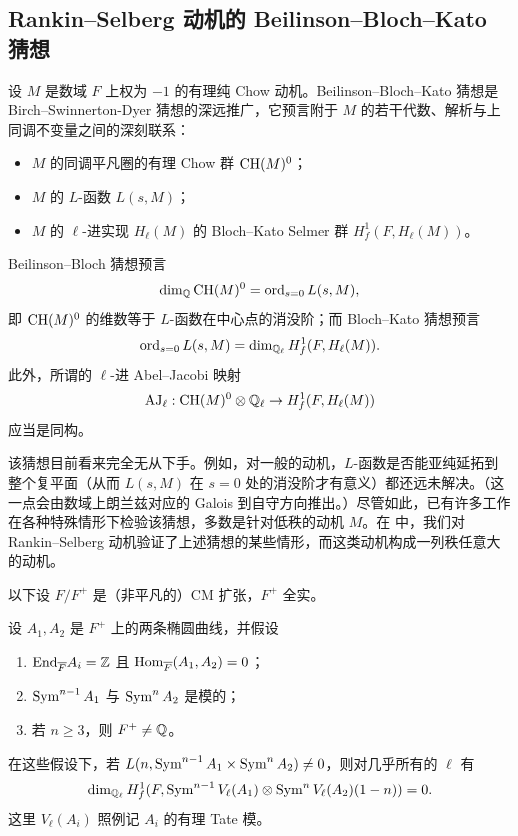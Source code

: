 
\subsection{Rankin--Selberg 动机的 Beilinson--Bloch--Kato 猜想}\label{S: BBK}

设 $M$ 是数域 $F$ 上权为 $-1$ 的有理纯 Chow 动机。Beilinson--Bloch--Kato 猜想是 Birch--Swinnerton-Dyer 猜想的深远推广，它预言附于 $M$ 的若干代数、解析与上同调不变量之间的深刻联系：
\begin{itemize}
\item $M$ 的同调平凡圈的有理 Chow 群 ${\operatorname{CH}}(M)^0$；
\item $M$ 的 $L$-函数 $L(s,M)$；
\item $M$ 的 $\ell$-进实现 $H_{\ell}(M)$ 的 Bloch--Kato Selmer 群 $H^1_f(F, H_{\ell}(M))$。
\end{itemize}
Beilinson--Bloch 猜想预言
\[
\dim_{{\mathbb Q}}{\operatorname{CH}}(M)^0 = \operatorname{ord}_{s=0}L(s,M),
\]
即 ${\operatorname{CH}}(M)^0$ 的维数等于 $L$-函数在中心点的消没阶；而 Bloch--Kato 猜想预言
\[
\operatorname{ord}_{s=0}L(s,M)= \dim_{{\mathbb Q}_\ell} H^1_f(F, H_{\ell}(M)).
\]
此外，所谓的 $\ell$-进 Abel--Jacobi 映射
\[
\operatorname{AJ}_\ell: \operatorname{CH}(M)^0\otimes {\mathbb Q}_\ell\to H^1_f(F, H_{\ell}(M))
\]
应当是同构。

该猜想目前看来完全无从下手。例如，对一般的动机，$L$-函数是否能亚纯延拓到整个复平面（从而 $L(s,M)$ 在 $s=0$ 处的消没阶才有意义）都还远未解决。（这一点会由数域上朗兰兹对应的 Galois 到自守方向推出。）尽管如此，已有许多工作在各种特殊情形下检验该猜想，多数是针对低秩的动机 $M$。在 \cite{LTXZZ-BBK} 中，我们对 Rankin--Selberg 动机验证了上述猜想的某些情形，而这类动机构成一列秩任意大的动机。

以下设 $F/F^+$ 是（非平凡的）CM 扩张，$F^+$ 全实。

\begin{thm}\label{RS-Sym-Elliptic}
设 $A_1,A_2$ 是 $F^+$ 上的两条椭圆曲线，并假设
\begin{enumerate}
\item\label{RS-Sym-Elliptic-1} ${\operatorname{End}}_{\overline F}A_i={\mathbb Z}$ 且 ${\operatorname{Hom}}_{\overline F}(A_1,A_2)=0$；
\item\label{RS-Sym-Elliptic-2} $\operatorname{Sym}^{n-1}A_1$ 与 $\operatorname{Sym}^nA_2$ 是模的；
\item\label{RS-Sym-Elliptic-3} 若 $n\geq 3$，则 $F^+\neq {\mathbb Q}$。
\end{enumerate}
在这些假设下，若 $L(n, \operatorname{Sym}^{n-1}A_1\times \operatorname{Sym}^nA_2)\neq 0$，则对几乎所有的 $\ell$ 有
\[
\dim_{{\mathbb Q}_\ell} H^1_f(F,  \operatorname{Sym}^{n-1}V_\ell(A_1)\otimes\operatorname{Sym}^nV_\ell(A_2)(1-n))=0.
\]
这里 $V_\ell(A_i)$ 照例记 $A_i$ 的有理 Tate 模。
\end{thm}

